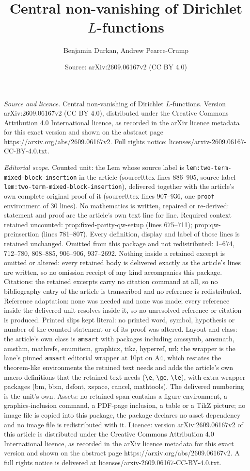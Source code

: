 \documentclass[10pt,a4paper]{amsart}
\title[Central non-vanishing of Dirichlet $L$-functions]{Central non-vanishing of Dirichlet $L$-functions}
\author{Benjamin Durkan, Andrew Pearce-Crump}
\date{Source: arXiv:2609.06167v2 (CC BY 4.0)}
\begin{document}
\maketitle

\noindent\emph{Source and licence.} Central non-vanishing of Dirichlet $L$-functions. Version arXiv:2609.06167v2 (CC BY 4.0), distributed under the Creative Commons Attribution 4.0 International licence, as recorded in the arXiv licence metadata for this exact version and shown on the abstract page https://arxiv.org/abs/2609.06167v2. Full rights notice: licenses/arxiv-2609.06167-CC-BY-4.0.txt.\par\smallskip

\noindent\textit{Editorial scope.} Counted unit: the Lem whose source label is \texttt{lem:two-term-mixed-block-insertion} in the article (source0.tex lines 886--905, source label \texttt{lem:two-term-mixed-block-insertion}), delivered together with the article's own complete original proof of it (source0.tex lines 907--936, one \texttt{proof} environment of 30 lines). No mathematics is written, repaired or re-derived: statement and proof are the article's own text line for line. Required context retained uncounted: prop:fixed-parity-qw-setup (lines 675--711); prop:qw-preinsertion (lines 781--807). Every definition, display and label of those lines is retained unchanged. Omitted from this package and not redistributed: 1--674, 712--780, 808--885, 906--906, 937--2692. Nothing inside a retained excerpt is omitted or altered: every retained body is delivered exactly as the article's lines are written, so no omission receipt of any kind accompanies this package. Citations: the retained excerpts carry no citation command at all, so no bibliography entry of the article is transcribed and no reference is redistributed. Reference adaptation: none was needed and none was made; every reference inside the delivered unit resolves inside it, so no unresolved reference or citation is produced. Printed slips kept literal: no printed word, symbol, hypothesis or number of the counted statement or of its proof was altered. Layout and class: the article's own class is \texttt{amsart} with packages including amssymb, amsmath, amsthm, mathrsfs, enumitem, graphicx, tikz, hyperref, url; the wrapper is the lane's pinned \texttt{amsart} editorial wrapper at 10pt on A4, which restates the theorem-like environments the retained text needs and adds the article's own macro definitions that the retained text needs (\texttt{\textbackslash e}, \texttt{\textbackslash ge}, \texttt{\textbackslash le}), with extra wrapper packages (bm, bbm, dsfont, xspace, cancel, mathtools). The delivered numbering is the unit's own. Assets: no retained span contains a figure environment, a graphics-inclusion command, a PDF-page inclusion, a table or a TikZ picture; no image file is copied into this package, the package declares no asset dependency and no image file is redistributed with it. Licence: version arXiv:2609.06167v2 of this article is distributed under the Creative Commons Attribution 4.0 International licence, as recorded in the arXiv licence metadata for this exact version and shown on the abstract page https://arxiv.org/abs/2609.06167v2. A full rights notice is delivered at licenses/arxiv-2609.06167-CC-BY-4.0.txt. 
\end{document}

